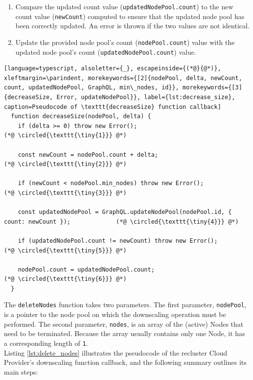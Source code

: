 \begin{enumerate}[label=\protect\circled{\arabic{*}}]
  \item Compare the updated count value (\texttt{updatedNodePool.count}) to the
    new count value (\texttt{newCount}) computed to ensure that the updated node
    pool has been correctly updated. An error is thrown if the two values are
    not identical.

  \item Update the provided node pool's count (\texttt{nodePool.count}) value
    with the updated node pool's count (\texttt{updatedNodePool.count}) value.
\end{enumerate}

\begin{lstlisting}[language=typescript, alsoletter={_}, escapeinside={(*@}{@*)}, xleftmargin=\parindent, morekeywords={[2]{nodePool, delta, newCount, count, updatedNodePool, GraphQL, min\_nodes, id}}, morekeywords={[3]{decreaseSize, Error, updateNodePool}}, label={lst:decrease_size}, caption=Pseudocode of \texttt{decreaseSize} function callback]
  function decreaseSize(nodePool, delta) {
    if (delta >= 0) throw new Error();                                                            (*@ \circled{\texttt{\tiny{1}}} @*)

    const newCount = nodePool.count + delta;                                                      (*@ \circled{\texttt{\tiny{2}}} @*)

    if (newCount < nodePool.min_nodes) throw new Error();                                         (*@ \circled{\texttt{\tiny{3}}} @*)

    const updatedNodePool = GraphQL.updateNodePool(nodePool.id, { count: newCount });             (*@ \circled{\texttt{\tiny{4}}} @*)

    if (updatedNodePool.count != newCount) throw new Error();                                     (*@ \circled{\texttt{\tiny{5}}} @*)

    nodePool.count = updatedNodePool.count;                                                       (*@ \circled{\texttt{\tiny{6}}} @*)
  }
\end{lstlisting}

The \texttt{deleteNodes} function takes two parameters. The first parameter,
\texttt{nodePool}, is a pointer to the node pool on which the downscaling
operation must be performed. The second parameter, \texttt{nodes}, is an array
of the (active) Nodes that need to be terminated. Because the array usually contains
only one Node, it has a corresponding length of \texttt{1}. \\ %
Listing \ref{lst:delete_nodes} illustrates the pseudocode of the recluster Cloud
Provider's downscaling function callback, and the following summary outlines its
main steps:

